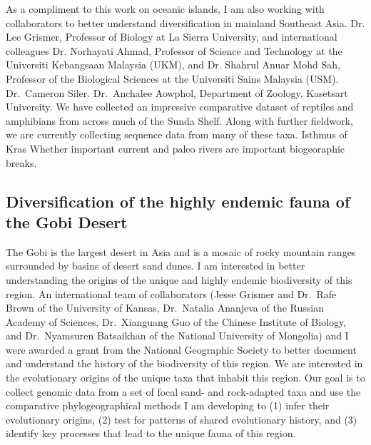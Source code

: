 \documentclass[10pt]{article}
\begin{document}
As a compliment to this work on oceanic islands, I am also working with
collaborators to better understand diversification in mainland Southeast Asia.
Dr. Lee Grismer, Professor of Biology at La Sierra University, and
international colleagues
Dr. Norhayati Ahmad, Professor of Science and Technology at the Universiti
Kebangsaan Malaysia (UKM), and
Dr. Shahrul Anuar Mohd Sah, Professor of the Biological Sciences at the
Universiti Sains Malaysia (USM).
Dr.\ Cameron Siler.
Dr.\ Anchalee Aowphol, Department of Zoology, Kasetsart University.
We have collected an impressive comparative dataset of reptiles and amphibians
from across much of the Sunda Shelf.
Along with further fieldwork, we are currently collecting sequence data
from many of these taxa.
Isthmus of Kras
Whether important current and paleo rivers are important biogeoraphic breaks.

\subsection*{Diversification of the highly endemic fauna of the Gobi Desert}
The Gobi is the largest desert in Asia and is a mosaic of rocky mountain ranges
surrounded by basins of desert sand dunes.
I am interested in better understanding the origins of the unique and highly
endemic biodiversity of this region.
An international team of collaborators
(Jesse Grismer and Dr.\ Rafe Brown of the University of Kansas,
Dr.\ Natalia Ananjeva of the Russian Academy of Sciences,
Dr.\ Xianguang Guo of the Chinese Institute of Biology, and
Dr.\ Nyamsuren Batsaikhan of the National University of Mongolia)
and I were awarded a grant from the National Geographic Society to better
document and understand the history of the biodiversity of this region.
We are interested in the evolutionary origins of the unique taxa that
inhabit this region.
Our goal is to collect genomic data from a set of focal sand- and rock-adapted
taxa and use the comparative phylogeographical methods I am developing to
(1) infer their evolutionary origins,
(2) test for patterns of shared evolutionary history, and
(3) identify key processes that lead to the unique fauna of this region.

\end{document}
